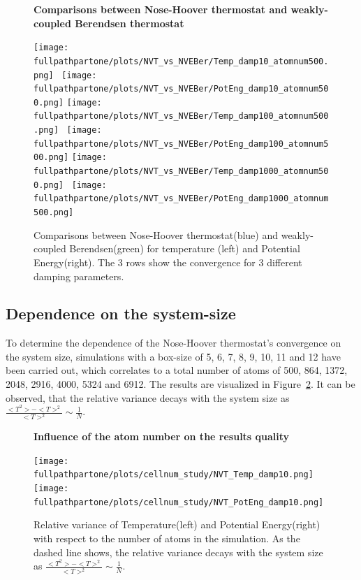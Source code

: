 \documentclass[10pt,a4paper]{report}
\def \fullpathpartone {/home/lukas/Desktop/project/independence/atomistic_modeling/exam/1_three-dimensional_atomic_system}
\newcommand*{\figuretitle}[1]{%
    {\centering%
    \textbf{#1}%
    \par\medskip}%
}
\begin{document}
\begin{center}
\begin{figure}[h]
\figuretitle{Comparisons between Nose-Hoover thermostat and weakly-coupled Berendsen thermostat}
\texttt{[image: \\fullpathpartone/plots/NVT\_vs\_NVEBer/Temp\_damp10\_atomnum500.png]}~
\texttt{[image: \\fullpathpartone/plots/NVT\_vs\_NVEBer/PotEng\_damp10\_atomnum500.png]}
\texttt{[image: \\fullpathpartone/plots/NVT\_vs\_NVEBer/Temp\_damp100\_atomnum500.png]}~
\texttt{[image: \\fullpathpartone/plots/NVT\_vs\_NVEBer/PotEng\_damp100\_atomnum500.png]}
\texttt{[image: \\fullpathpartone/plots/NVT\_vs\_NVEBer/Temp\_damp1000\_atomnum500.png]}~
\texttt{[image: \\fullpathpartone/plots/NVT\_vs\_NVEBer/PotEng\_damp1000\_atomnum500.png]}
\caption[Comparisons between Nose-Hoover thermostat and weakly-coupled Berendsen thermostat]{Comparisons between Nose-Hoover thermostat(blue) and weakly-coupled Berendsen(green) for temperature (left) and Potential Energy(right). The 3 rows show the convergence for 3 different damping parameters.}
\label{fig:p1_NVT_vs_NVEBer}
\end{figure}
\end{center}


\subsection{Dependence on the system-size}
To determine the dependence of the Nose-Hoover thermostat's convergence on the system size, simulations with a box-size of 5, 6, 7, 8, 9, 10, 11 and 12 have been carried out, which correlates to a total number of atoms of 500, 864, 1372, 2048, 2916, 4000, 5324 and 6912. The results are visualized in Figure~\ref{fig:p1_cellnum_study}. It can be observed, that the relative variance decays with the system size as $\frac{<T^2>-<T>^2}{<T>^2}\sim\frac{1}{N}$.

\begin{center}
\begin{figure}[h]
\figuretitle{Influence of the atom number on the results quality}
\texttt{[image: \\fullpathpartone/plots/cellnum\_study/NVT\_Temp\_damp10.png]}
\texttt{[image: \\fullpathpartone/plots/cellnum\_study/NVT\_PotEng\_damp10.png]}
\caption[Influence of the atom number on the results quality]{Relative variance of Temperature(left) and Potential Energy(right) with respect to the number of atoms in the simulation. As the dashed line shows, the relative variance decays with the system size as $\frac{<T^2>-<T>^2}{<T>^2}\sim\frac{1}{N}$.}
\label{fig:p1_cellnum_study}
\end{figure}
\end{center}
\end{document}

